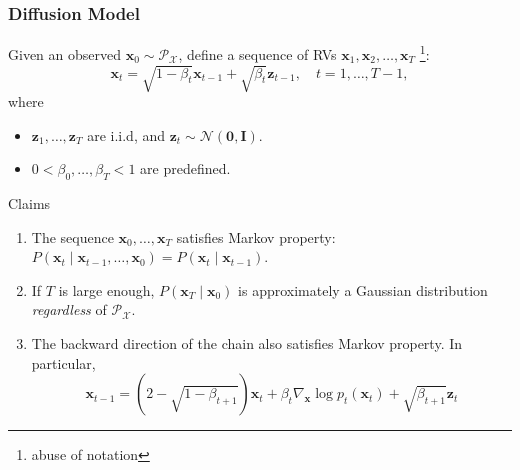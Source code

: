 \documentclass[10pt,xcolor={usenames,dvipsnames,table},aspectratio=169]{beamer}
\begin{document}
\begin{frame}
    \frametitle{Diffusion Model}
    Given an observed $\bm{x}_0 \sim \mathcal{P}_{\mathcal{X}}$, define a sequence of RVs $\bm{x}_1, \bm{x}_2, \ldots , \bm{x}_{T}$ \footnote{ abuse of notation}:
    \[
    \bm{x}_t = \sqrt{1- \beta_t} \bm{x}_{t-1} + \sqrt{\beta_t} \bm{z}_{t-1}, \quad t = 1, \ldots , T-1,
    \] 
    where 
    \begin{itemize}
        \item $\bm{z}_1, \ldots , \bm{z}_T$ are i.i.d, and $\bm{z}_t \sim \mathcal{N}(\bm{0}, \bm{I})$.
        \item $0 < \beta_0, \ldots , \beta_T < 1$ are predefined.
    \end{itemize}
    \begin{block}{Claims}
        \begin{enumerate}
            \item The sequence $\bm{x}_0, \ldots , \bm{x}_T$ satisfies Markov property: $P(\bm{x}_t \mid \bm{x}_{t-1}, \ldots , \bm{x}_0) = P(\bm{x}_t \mid \bm{x}_{t-1})$.
            \item If $T$ is large enough, $P(\bm{x}_T \mid \bm{x}_0)$ is approximately a Gaussian distribution \textit{regardless} of $\mathcal{P}_{\mathcal{X}}$.
            \item The backward direction of the chain also satisfies Markov property. In particular,
                \[
                \bm{x}_{t-1} = \left( 2- \sqrt{1 - \beta_{t+1}} \right) \bm{x}_t + \beta_t \nabla_{\bm{x}} \log p_t(\bm{x}_t) + \sqrt{\beta_{t+1}} \bm{z}_t
                \] 
        \end{enumerate}
    \end{block}
\end{frame}
\end{document}
